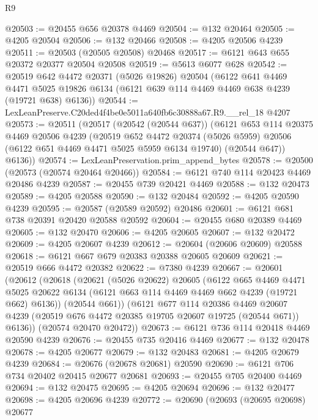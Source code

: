 \begin{lexlean}{R9}
\begin{coremodule}
@20503 := @20455 @656 @20378 @4469
@20504 := @132 @20464
@20505 := @4205 @20504
@20506 := @132 @20466
@20508 := @4205 @20506 @4239
@20511 := @20503 (@20505 @20508) @20468
@20517 := @6121 @643 @655 @20372 @20377 @20504 @20508
@20519 := @5613 @6077 @628
@20542 := @20519
    @642
    @4472
    @20371
    (@5026 @19826)
    @20504
    (@6122
      @641
      @4469
      @4471
      @5025
      @19826
      @6134
      (@6121 @639 @114 @4469 @4469 @638 @4239 (@19721 @638) @6136))
@20544 := LexLeanPreserve.C20ded4f4be0e5011a640fb6c30888a67.R9.__rel_18 @4207
@20573 := @20511
    (@20517
      (@20542 (@20544 @637))
      (@6121
        @653
        @114
        @20375
        @4469
        @20506
        @4239
        (@20519
          @652
          @4472
          @20374
          (@5026 @5959)
          @20506
          (@6122 @651 @4469 @4471 @5025 @5959 @6134 @19740)
          (@20544 @647))
        @6136))
@20574 := LexLeanPreservation.prim_append_bytes
@20578 := @20500 (@20573 (@20574 @20464 @20466))
@20584 := @6121 @740 @114 @20423 @4469 @20486 @4239
@20587 := @20455 @739 @20421 @4469
@20588 := @132 @20473
@20589 := @4205 @20588
@20590 := @132 @20484
@20592 := @4205 @20590 @4239
@20595 := @20587 (@20589 @20592) @20486
@20601 := @6121 @681 @738 @20391 @20420 @20588 @20592
@20604 := @20455 @680 @20389 @4469
@20605 := @132 @20470
@20606 := @4205 @20605
@20607 := @132 @20472
@20609 := @4205 @20607 @4239
@20612 := @20604 (@20606 @20609) @20588
@20618 := @6121 @667 @679 @20383 @20388 @20605 @20609
@20621 := @20519 @666 @4472 @20382
@20622 := @7380 @4239
@20667 := @20601
    (@20612
      (@20618
        (@20621
          (@5026 @20622)
          @20605
          (@6122
            @665
            @4469
            @4471
            @5025
            @20622
            @6134
            (@6121 @663 @114 @4469 @4469 @662 @4239 (@19721 @662) @6136))
          (@20544 @661))
        (@6121
          @677
          @114
          @20386
          @4469
          @20607
          @4239
          (@20519 @676 @4472 @20385 @19705 @20607 @19725 (@20544 @671))
          @6136))
      (@20574 @20470 @20472))
@20673 := @6121 @736 @114 @20418 @4469 @20590 @4239
@20676 := @20455 @735 @20416 @4469
@20677 := @132 @20478
@20678 := @4205 @20677
@20679 := @132 @20483
@20681 := @4205 @20679 @4239
@20684 := @20676 (@20678 @20681) @20590
@20690 := @6121 @706 @734 @20402 @20415 @20677 @20681
@20693 := @20455 @705 @20400 @4469
@20694 := @132 @20475
@20695 := @4205 @20694
@20696 := @132 @20477
@20698 := @4205 @20696 @4239
@20772 := @20690
    (@20693
      (@20695 @20698)
      @20677

\end{coremodule}
\end{lexlean}
